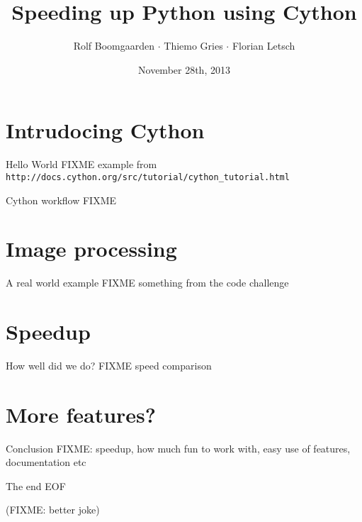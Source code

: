 \documentclass{beamer}
\title{Speeding up Python using Cython}
\author[Rolf $\cdot$ Thiemo $\cdot$ Flo]{Rolf Boomgaarden $\cdot$ Thiemo Gries $\cdot$ Florian Letsch}
\institute{Universität Hamburg}
\date{November 28th, 2013}
\begin{document}
\frame
{
\titlepage
}

\frame
{
\tableofcontents
}

\section{Intrudocing Cython}


\begin{frame}{Hello World}
FIXME example from \lstinline{http://docs.cython.org/src/tutorial/cython_tutorial.html}
\end{frame}

\begin{frame}{Cython workflow}
FIXME
\end{frame}


\section{Image processing}

\begin{frame}{A real world example}
FIXME something from the code challenge
\end{frame}

\section{Speedup}

\begin{frame}{How well did we do?}
FIXME speed comparison
\end{frame}

\section{More features?}

\begin{frame}{Conclusion}
FIXME: speedup, how much fun to work with, easy use of features, documentation etc
\end{frame}

\begin{frame}{The end}
EOF

(FIXME: better joke)
\end{frame}
\end{document}

